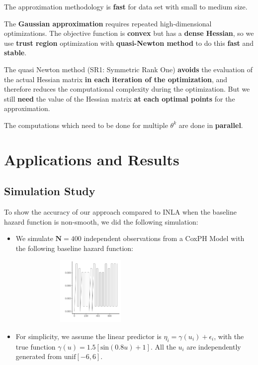 \documentclass{beamer} %
\begin{document}
\begin{frame}
The approximation methodology is \textbf{fast} for data set with small to medium size.
\pause

The \textbf{Gaussian approximation} requires repeated high-dimensional optimizations. The objective function is \textbf{convex} but has a \textbf{dense Hessian}, so we use \textbf{trust region} optimization with \textbf{quasi-Newton method} \citep{trustoptim} to do this \textbf{fast} and \textbf{stable}.

\pause

The quasi Newton method (SR1: Symmetric Rank One) \textbf{avoids} the evaluation of the actual Hessian matrix \textbf{in each iteration of the optimization}, and therefore reduces the computational complexity during the optimization. But we still \textbf{need} the value of the Hessian matrix \textbf{at each optimal points} for the approximation.

\pause

The computations which need to be done for multiple $\theta^{k}$ are done in \textbf{parallel}.
\end{frame}

\section{Applications and Results}
\subsection{Simulation Study}
\begin{frame}
To show the accuracy of our approach compared to INLA when the baseline hazard function is non-smooth, we did the following simulation:
\begin{itemize}
\item We simulate $\textbf{N} = 400$ independent observations from a CoxPH Model with the following baseline hazard function:
\begin{figure}
\centering
\includegraphics[width=0.55\textwidth,height=1.3in]{sim_base}
\end{figure}
\pause
\item For simplicity, we assume the linear predictor is $\eta_i = \gamma(u_i) + \epsilon_i$, with the true function $\gamma(u) = 1.5[\text{sin}(0.8u)+1]$. All the $u_i$ are independently generated from $\text{unif}[-6,6]$. 
\end{itemize}
\end{frame}
\end{document}
